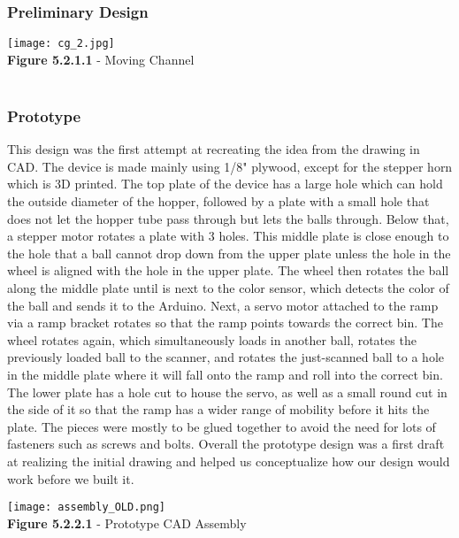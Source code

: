\documentclass{article}
\begin{document}
\subsubsection{Preliminary Design}

\begin{center}
    \texttt{[image: cg\_2.jpg]}\\
    \small{\textbf{Figure 5.2.1.1} - Moving Channel}\\~\\
\end{center}

\subsubsection{Prototype}

This design was the first attempt at recreating the idea from the drawing in CAD. The device is made mainly using 1/8" plywood, except for the stepper horn which is 3D printed. The top plate of the device has a large hole which can hold the outside diameter of the hopper, followed by a plate with a small hole that does not let the hopper tube pass through but lets the balls through. Below that, a stepper motor rotates a plate with 3 holes. This middle plate is close enough to the hole that a ball cannot drop down from the upper plate unless the hole in the wheel is aligned with the hole in the upper plate. The wheel then rotates the ball along the middle plate until is next to the color sensor, which detects the color of the ball and sends it to the Arduino. Next, a servo motor attached to the ramp via a ramp bracket rotates so that the ramp points towards the correct bin. The wheel rotates again, which simultaneously loads in another ball, rotates the previously loaded ball to the scanner, and rotates the just-scanned ball to a hole in the middle plate where it will fall onto the ramp and roll into the correct bin. The lower plate has a hole cut to house the servo, as well as a small round cut in the side of it so that the ramp has a wider range of mobility before it hits the plate. The pieces were mostly to be glued together to avoid the need for lots of fasteners such as screws and bolts. Overall the prototype design was a first draft at realizing the initial drawing and helped us conceptualize how our design would work before we built it.

\begin{center}
    \texttt{[image: assembly\_OLD.png]}\\
    \small{\textbf{Figure 5.2.2.1} - Prototype CAD Assembly}\\~\\
\end{center}
\end{document}
